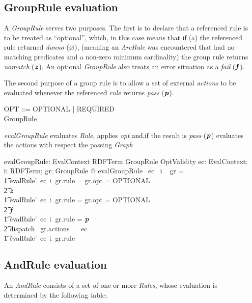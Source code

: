 \documentclass[fuzz]{llncs}
\def\pass{\textbf{\textit{p}}}
\def\fail{\textbf{\textit{f}}}
\def\dunno{\varnothing}
\def\error{\varepsilon}
\def\nomatch{\textbf{\textit{z}}}
\def\zc{\textit}
\begin{document}
\subsection{GroupRule evaluation}
A \zc{GroupRule} serves two purposes.  The first is to declare that a referenced rule is to be
treated as ``optional'', which, in this case means that if (a) the referenced rule returned
\zc{dunno} ($\dunno$), (meaning an \zc{ArcRule} was encountered that had no matching
predicates and a non-zero minimum cardinality) the group rule returns \zc{nomatch} 
($\nomatch$).  An optional \zc{GroupRule} also treats an error situation as a \zc{fail} 
($\fail$).

The second purpose of a group rule is to allow a set of external \zc{actions} to be evaluated
whenever the referenced \zc{rule} returns \zc{pass} ($\pass$). 


\begin{zed}
OPT ::= OPTIONAL | REQUIRED \\
GroupRule  \\
\end{zed}
\zc{evalGroupRule} evaluates \zc{Rule}, applies \zc{opt} and,if the result is \zc{pass} ($\pass$) evaluates the actions with respect the passing \zc{Graph} 
\begin{gendef}
   evalGroupRule: EvalContext \fun RDFTerm \fun GroupRule \fun OptValidity
\where
   \forall ec: EvalContext; i: RDFTerm; gr: GroupRule @ evalGroupRule~ ec~ i ~ gr = \\
\t1 \IF evalRule'~ec~i~gr.rule = \dunno \land gr.opt = OPTIONAL \\
\t2 \THEN \nomatch \\
\t1 \ELSE \IF evalRule'~ec~i~gr.rule = \error \land gr.opt = OPTIONAL \\
\t2 \THEN \fail \\
\t1 \ELSE \IF evalRule'~ec~i~gr.rule = \pass \\
\t2 \THEN dispatch~ gr.actions~ \emptyset ~ ec \\
\t1 \ELSE evalRule'~ec~i~gr.rule
\end{gendef}

\subsection{AndRule evaluation}
An \zc{AndRule} consists of a set of one or more \zc{Rules}, whose evaluation is determined
by the following table: \\
\end{document}
